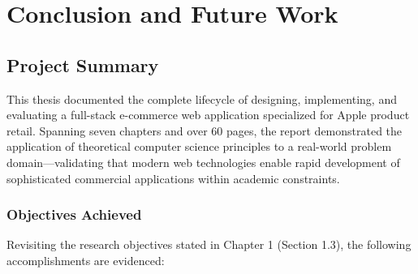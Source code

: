 
\chapter{Conclusion and Future Work}

\section{Project Summary}

This thesis documented the complete lifecycle of designing, implementing, and evaluating a full-stack e-commerce web application specialized for Apple product retail. Spanning seven chapters and over 60 pages, the report demonstrated the application of theoretical computer science principles to a real-world problem domain—validating that modern web technologies enable rapid development of sophisticated commercial applications within academic constraints.

\subsection{Objectives Achieved}

Revisiting the research objectives stated in Chapter 1 (Section 1.3), the following accomplishments are evidenced:

